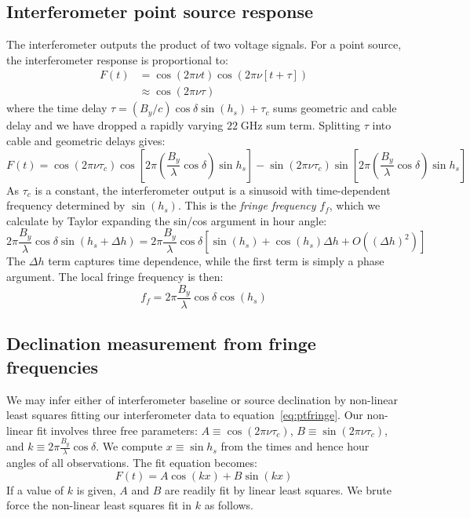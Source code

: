 \documentclass[10pt]{article}
\newcommand {\mt}{\mathrm}
\newcommand {\unit}[1]{\; \mt{#1}}
\begin{document}
\subsection{Interferometer point source response}

The interferometer outputs the product of two voltage signals.  For a point source, the interferometer response is proportional to:
\begin{align*}
	F(t) &= \cos(2\pi\nu t) \cos\left(2\pi\nu \left[ t + \tau \right] \right) \\
		 &\approx \cos\left(2\pi\nu \tau\right)
\end{align*}
where the time delay $\tau = (B_y / c) \cos\delta \sin(h_s) + \tau_c$ sums geometric and cable delay and we have dropped a rapidly varying $22 \unit{GHz}$ sum term.
Splitting $\tau$ into cable and geometric delays gives:
\begin{equation} \label{eq:ptfringe}
	F(t) = \cos(2\pi\nu\tau_c)
			\cos \left[2\pi \left(\frac{B_y}{\lambda}\cos\delta\right)
			           \sin h_s \right]
			- \sin(2\pi\nu\tau_c)
			\sin \left[2\pi \left(\frac{B_y}{\lambda}\cos\delta\right)
			           \sin h_s \right]
\end{equation}
As $\tau_c$ is a constant, the interferometer output is a sinusoid with time-dependent frequency determined by $\sin(h_s)$.  This is the \emph{fringe frequency} $f_f$, which we calculate by Taylor expanding the sin/cos argument in hour angle:
\[
    2\pi \frac{B_y}{\lambda}\cos\delta \sin (h_s + \Delta h)
    = 2\pi \frac{B_y}{\lambda}\cos\delta \left[
        \sin (h_s) + \cos (h_s) \Delta h + O\left((\Delta h)^2\right)
      \right]
\]
The $\Delta h$ term captures time dependence, while the first term is simply a phase argument.  The local fringe frequency is then:
\[
    f_f = 2\pi \frac{B_y}{\lambda} \cos\delta \cos\left(h_s\right)
\]

\subsection{Declination measurement from fringe frequencies}

We may infer either of interferometer baseline or source declination by non-linear least squares fitting our interferometer data to equation~\ref{eq:ptfringe}.  Our non-linear fit involves three free parameters: $A \equiv \cos(2\pi\nu\tau_c)$, $B \equiv \sin(2\pi\nu\tau_c)$, and $k \equiv 2\pi \frac{B_y}{\lambda}\cos\delta$.  We compute $x \equiv \sin h_s$ from the times and hence hour angles of all observations.  The fit equation becomes:
\[
    F(t) = A \cos(k x) + B \sin(k x)
\]
If a value of $k$ is given, $A$ and $B$ are readily fit by linear least squares.  We brute force the non-linear least squares fit in $k$ as follows.
\end{document}
